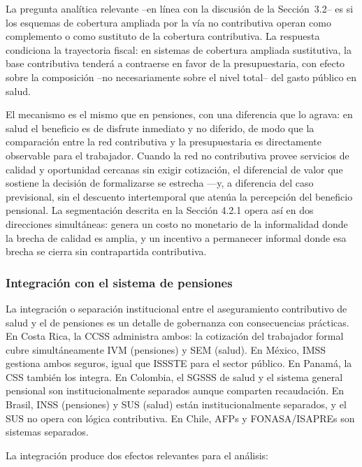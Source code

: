 \documentclass[12pt, letterpaper]{article}
\begin{document}
La pregunta analítica relevante --en línea con la discusión de la
Sección~3.2-- es si los esquemas de cobertura ampliada por la vía no contributiva
operan como complemento o como sustituto de la cobertura contributiva. La
respuesta condiciona la trayectoria fiscal: en sistemas de cobertura ampliada
sustitutiva, la base contributiva tenderá a contraerse en favor de la
presupuestaria, con efecto sobre la composición --no necesariamente sobre el
nivel total-- del gasto público en salud.

El mecanismo es el mismo que en pensiones, con una diferencia que lo agrava: en
salud el beneficio es de disfrute inmediato y no diferido, de modo que la
comparación entre la red contributiva y la presupuestaria es directamente
observable para el trabajador. Cuando la red no contributiva provee servicios de
calidad y oportunidad cercanas sin exigir cotización, el diferencial de valor que
sostiene la decisión de formalizarse se estrecha ---y, a diferencia del caso
previsional, sin el descuento intertemporal que atenúa la percepción del beneficio
pensional. La segmentación descrita en la Sección 4.2.1 opera así en dos
direcciones simultáneas: genera un costo no monetario de la informalidad donde la
brecha de calidad es amplia, y un incentivo a permanecer informal donde esa brecha
se cierra sin contrapartida contributiva.

\subsubsection{Integración con el sistema de pensiones}

La integración o separación institucional entre el aseguramiento contributivo de
salud y el de pensiones es un detalle de gobernanza con consecuencias prácticas.
En Costa Rica, la CCSS administra ambos: la cotización del trabajador formal cubre
simultáneamente IVM (pensiones) y SEM (salud). En México, IMSS gestiona ambos
seguros, igual que ISSSTE para el sector público. En Panamá, la CSS también los
integra. En Colombia, el SGSSS de salud y el sistema general pensional son
institucionalmente separados aunque comparten recaudación. En Brasil, INSS
(pensiones) y SUS (salud) están institucionalmente separados, y el SUS no opera con
lógica contributiva. En Chile, AFPs y FONASA/ISAPREs son sistemas separados.

La integración produce dos efectos relevantes para el análisis:
\end{document}
